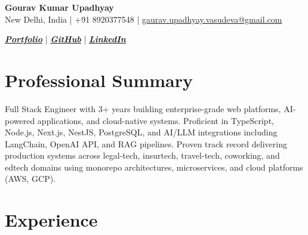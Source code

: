 \documentclass[a4paper,9pt]{article}
\begin{document}

\begin{center}

{\LARGE \textbf{Gourav Kumar Upadhyay}} \\[3pt]

{\footnotesize
New Delhi, India
\quad | \quad
+91 8920377548
\quad | \quad
\href{mailto:gaurav.upadhyay.vasudeva@gmail.com}{gaurav.upadhyay.vasudeva@gmail.com}
}

\vspace{2pt}

{\footnotesize
\href{https://itsgauravhere.netlify.app/}{\textbf{\textit{Portfolio}}}
\quad | \quad
\href{https://github.com/Poi5eN}{\textbf{\textit{GitHub}}}
\quad | \quad
\href{https://www.linkedin.com/in/gourav-kumar-upadhyay-0731b41b4}{\textbf{\textit{LinkedIn}}}
}

\end{center}

\vspace{0.5mm}


\section*{Professional Summary}

{\footnotesize
Full Stack Engineer with 3+ years building enterprise-grade web platforms, AI-powered applications, and cloud-native systems. Proficient in TypeScript, Node.js, Next.js, NestJS, PostgreSQL, and AI/LLM integrations including LangChain, OpenAI API, and RAG pipelines. Proven track record delivering production systems across legal-tech, insurtech, travel-tech, coworking, and edtech domains using monorepo architectures, microservices, and cloud platforms (AWS, GCP).
}

\vspace{0.5mm}


\section*{Experience}
\end{document}
